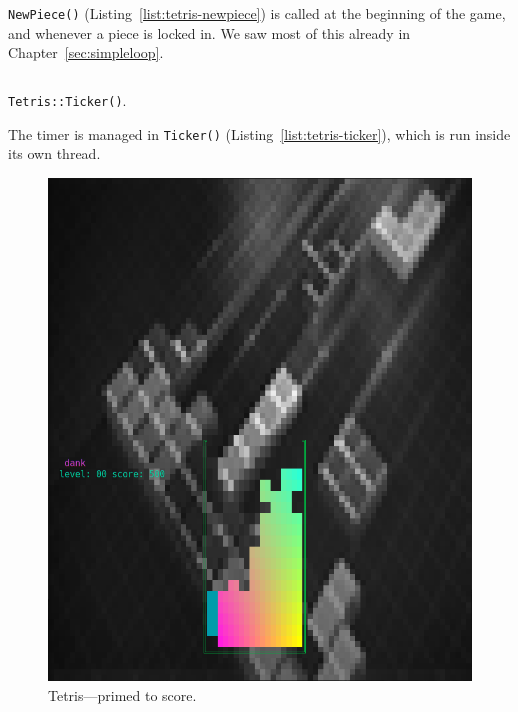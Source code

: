 \texttt{NewPiece()} (Listing~\ref{list:tetris-newpiece}) is called at the
beginning of the game, and whenever a piece is locked in. We saw most of this
already in Chapter~\ref{sec:simpleloop}.

\begin{listing}[!htb]
\inputminted[]{C}{code-tetris/ticker.h}
\caption{\texttt{Tetris::Ticker()}.}
\label{list:tetris-ticker}
\end{listing}

The timer is managed in \texttt{Ticker()} (Listing~\ref{list:tetris-ticker}),
which is run inside its own thread.

\begin{figure}
  \centering
  \begin{minipage}{0.45\textwidth}
    \includegraphics[width=1\linewidth]{media/tetris-prescore.png}
    \caption{Tetris---primed to score.}
  \end{minipage}\hfill
  \begin{minipage}{0.45\textwidth}

\end{minipage}
\end{figure}
